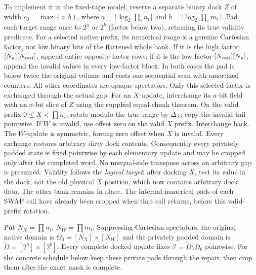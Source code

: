 To implement it in the fixed-tape model, reserve a separate binary dock
$Z$ of width $c_0=\max(a,b)$, where
$a=\lceil\log_2\prod_i n_i\rceil$ and
$b=\lceil\log_2\prod_i m_i\rceil$.  Pad each target range once to
$2^a$ or $2^b$ (factor below two), retaining its true validity predicate.
For a selected native prefix, its numerical range is a genuine Cartesian
factor, not low binary bits of the flattened whole bank. If it is the
high factor $[N_u][N_{\rm rest}]$, append entire opposite-factor rows;
if it is the low factor $[N_{\rm rest}][N_u]$, append the invalid values
in every low-factor block. In both cases the pad is below twice the
original volume and costs one sequential scan with amortized counters.
All other coordinates are opaque spectators. Only this selected factor
is exchanged through the actual gap. For an $X$-update, interchange its $a$-bit field with an $a$-bit slice of
$Z$ using the supplied equal-chunk theorem.  On the valid prefix
$0\le X<\prod n_i$, rotate modulo the true range by $\Delta_X$; copy the
invalid tail pointwise.  If $W$ is invalid, use offset zero on the valid
$X$ prefix.  Interchange back.  The $W$-update is symmetric, forcing zero
offset when $X$ is invalid.  Every exchange restores arbitrary dirty dock
contents.  Consequently every privately padded state is fixed pointwise
by each elementary update and may be cropped only after the completed
word.  No unequal-side transpose across an arbitrary gap is presumed.
Validity follows the \emph{logical target}: after docking $X$, test
its value in the dock, not the old physical $X$ position, which now
contains arbitrary dock data. The other bank remains in place.
The internal numerical pads of each SWAP call have already been
cropped when that call returns, before this valid-prefix rotation.

Put $N_X=\prod n_i$, $N_W=\prod m_i$. Suppressing Cartesian
spectators, the original native domain is
$\Omega_0=[N_X]\times[N_W]$ and the privately padded domain is
$\widetilde\Omega=[2^a]\times[2^b]$.
Every complete docked update fixes
$\mathcal I=\widetilde\Omega\setminus\Omega_0$ pointwise.
For the concrete schedule below keep these private pads through
the repair, then crop them after the exact mask is complete.

